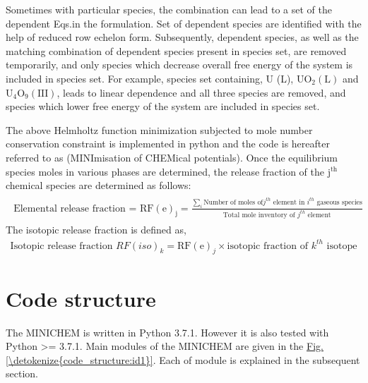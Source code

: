 \documentclass[letterpaper,10pt,english]{sphinxmanual}
\begin{document}
Sometimes with particular species, the combination can lead to a set of the
dependent Eqs.in the formulation. Set of dependent species are identified
with the help of reduced row echelon form. Subsequently, dependent species, as
well as the matching combination of dependent species present in species set,
are removed temporarily, and only species which decrease overall free energy
of the system is included in species set. For example, species set containing,
U (L), \(\mathrm{UO_{2}(L)}\) and \(\mathrm{U_4O_9(III)}\),
leads to linear dependence and all three species are removed, and species
which lower free energy of the system are included in species set.

The above Helmholtz function minimization subjected to mole number
conservation constraint is implemented in python and the code is hereafter
referred to as  (MINImisation of CHEMical potentials). Once the equilibrium species moles in various
phases are determined, the release fraction of
the \(\mathrm{j^{th}}\) chemical species are determined as follows:
\begin{equation*}
\begin{split}\begin{aligned}
\text{Elemental release fraction = }\mathrm{{RF(e)}_j} =
\frac{{\sum\limits}_{i} \text{Number of moles of
\(j^{th}\) element in \(i^{th}\) gaseous species}}{\text{Total mole
inventory of \(j^{th}\) element}}
\end{aligned}\end{split}
\end{equation*}
The isotopic release fraction is defined as,
\begin{equation*}
\begin{split}\text{Isotopic release fraction }{RF(iso)}_k = {\mathrm{RF(e)}_j} \times
\text{isotopic fraction of \(k^{th}\) isotope}\end{split}
\end{equation*}

\chapter{Code structure}
\label{\detokenize{code_structure:code-structure}}\label{\detokenize{code_structure::doc}}
The MINICHEM is written in Python 3.7.1. However it is also tested with
Python \textgreater{}= 3.7.1. Main modules of the MINICHEM are given in the
\hyperref[\detokenize{code_structure:id1}]{Fig.\@ \ref{\detokenize{code_structure:id1}}}. Each of module is explained in the subsequent section.
\end{document}
